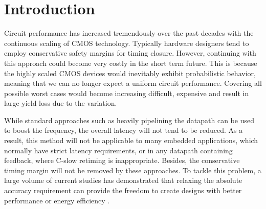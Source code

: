 \documentclass{acm_proc_article-sp}
\begin{document}
\section{Introduction}
Circuit performance has increased tremendously over the past decades with the continuous scaling of CMOS technology. Typically hardware designers tend to employ conservative safety margins for timing closure. However, continuing with this approach could become very costly in the short term future. This is because the highly scaled CMOS devices would inevitably exhibit probabilistic behavior, meaning that we can no longer expect a uniform circuit performance. Covering all possible worst cases would become increasing difficult, expensive and result in large yield loss due to the variation.\vspace{-1ex}

While standard approaches such as heavily pipelining the datapath can be used to boost the frequency, the overall latency will not tend to be reduced. As a result, this method will not be applicable to many embedded applications, which normally have strict latency requirements, or in any datapath containing feedback, where C-slow retiming is inappropriate. Besides, the conservative timing margin will not be removed by these approaches. To tackle this problem, a large volume of current studies has demonstrated that relaxing the absolute accuracy requirement can provide the freedom to create designs with better performance or energy efficiency \cite{Razor2004,Gupta2013TransCADICS,NonUniformScaling,Undersigned2x2multiplier}.\vspace{-1ex}
\end{document}
